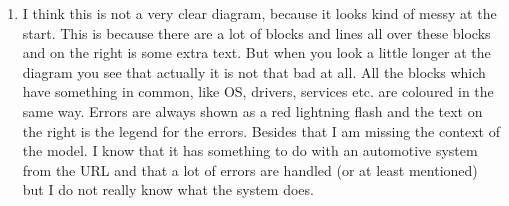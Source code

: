 \begin{enumerate}
	\item I think this is not a very clear diagram, because it looks kind of messy at the start.
	This is because there are a lot of blocks and lines all over these blocks and on the right is some extra text.
	But when you look a little longer at the diagram you see that actually it is not that bad at all. 
	All the blocks which have something in common, like OS, drivers, services etc. are coloured in the same way. 
	Errors are always shown as a red lightning flash and the text on the right is the legend for the errors.
	Besides that I am missing the context of the model. 
	I know that it has something to do with an automotive system from the URL and that a lot of errors are handled (or at least mentioned) but I do not really know what the system does.
\end{enumerate}